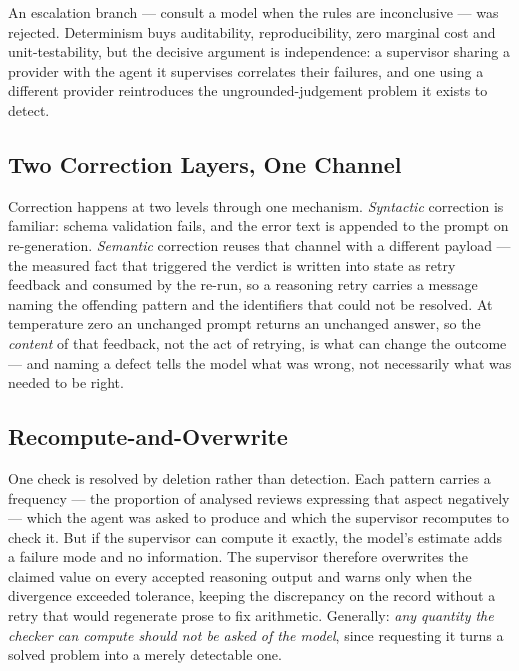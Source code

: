 \documentclass[runningheads]{llncs}
\begin{document}
An escalation branch --- consult a model when the rules are inconclusive --- was
rejected. Determinism buys auditability, reproducibility, zero marginal cost and
unit-testability, but the decisive argument is independence: a supervisor sharing
a provider with the agent it supervises correlates their failures, and one using a
different provider reintroduces the ungrounded-judgement problem it exists to
detect.

\subsection{Two Correction Layers, One Channel}
\label{sec:correction}

Correction happens at two levels through one mechanism. \emph{Syntactic}
correction is familiar: schema validation fails, and the error text is appended
to the prompt on re-generation. \emph{Semantic} correction reuses that channel
with a different payload --- the measured fact that triggered the verdict is
written into state as retry feedback and consumed by the re-run, so a reasoning
retry carries a message naming the offending pattern and the identifiers that
could not be resolved. At temperature zero an unchanged prompt returns an
unchanged answer, so the \emph{content} of that feedback, not the act of
retrying, is what can change the outcome --- and naming a defect tells the model
what was wrong, not necessarily what was needed to be right.

\subsection{Recompute-and-Overwrite}
\label{sec:recompute}

One check is resolved by deletion rather than detection. Each pattern carries a
frequency --- the proportion of analysed reviews expressing that aspect
negatively --- which the agent was asked to produce and which the supervisor
recomputes to check it. But if the supervisor can compute it exactly, the model's
estimate adds a failure mode and no information. The supervisor therefore
overwrites the claimed value on every accepted reasoning output and warns only
when the divergence exceeded tolerance, keeping the discrepancy on the record
without a retry that would regenerate prose to fix arithmetic. Generally:
\emph{any quantity the checker can compute should not be asked of the model},
since requesting it turns a solved problem into a merely detectable one.
\end{document}
